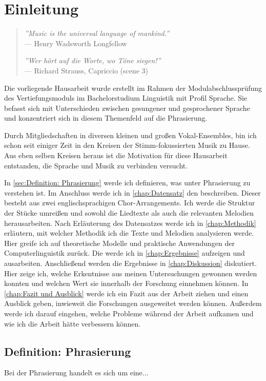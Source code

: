 \chapter{Einleitung}
\label{chap:Einleitung}


\begin{quote}
\textit{''Music is the universal language of mankind.''}
\\--- Henry Wadsworth Longfellow

\textit{''Wer hört auf die Worte, wo Töne siegen!''} 
\\--- Richard Strauss, Capriccio (scene 3)
\end{quote}

\vspace{1cm}

Die vorliegende Hausarbeit wurde erstellt im Rahmen der Modulabschlussprüfung des Vertiefungsmoduls im Bachelorstudium Linguistik mit Profil Sprache. Sie befasst sich mit Unterschieden zwischen gesungener und gesprochener Sprache und konzentriert sich in diesem Themenfeld auf die Phrasierung.

Durch Mitgliedschaften in diversen kleinen und großen Vokal-Ensembles, bin ich schon seit einiger Zeit in den Kreisen der Stimm-fokussierten Musik zu Hause. Aus eben selben Kreisen heraus ist die Motivation für diese Hausarbeit entstanden, die Sprache und Musik zu verbinden versucht.

In \autoref{sec:Definition: Phrasierung} werde ich definieren, was unter Phrasierung zu verstehen ist.
Im Anschluss werde ich in \autoref{chap:Datensatz} den  beschreiben. Dieser besteht aus zwei englischsprachigen Chor-Arrangements. Ich werde die Struktur der Stücke umreißen und sowohl die Liedtexte als auch die relevanten Melodien herausarbeiten.
Nach Erläuterung des Datensatzes werde ich in \autoref{chap:Methodik} erläutern, mit welcher Methodik ich die Texte und Melodien analysieren werde. Hier greife ich auf theoretische Modelle und praktische Anwendungen der Computerlinguistik zurück.
Die  werde ich in \autoref{chap:Ergebnisse} aufzeigen und ausarbeiten.
Anschließend werden die Ergebnisse in \autoref{chap:Diskussion} diskutiert. Hier zeige ich, welche Erkentnisse aus meinen Untersuchungen gewonnen werden konnten und welchen Wert sie innerhalb der Forschung einnehmen können.
In \autoref{chap:Fazit und Ausblick} werde ich ein Fazit aus der Arbeit ziehen und einen Ausblick geben, inwieweit die Forschungen ausgeweitet werden können. Außerdem werde ich darauf eingehen, welche Probleme während der Arbeit aufkamen und wie ich die Arbeit hätte verbessern können.










\section{Definition: Phrasierung}
\label{sec:Definition: Phrasierung}

Bei der Phrasierung handelt es sich um eine...